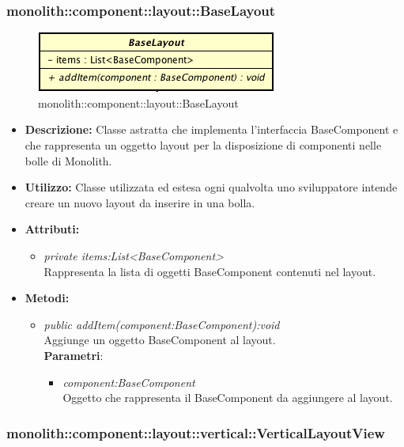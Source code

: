 \subsubsection{monolith::component::layout::BaseLayout}

\label{monolith::component::layout::BaseLayout}
\begin{figure}[ht]
	\centering
	\includegraphics[scale=0.5]{Sezioni/SottosezioniST/img/BaseLayout.png}
	\caption{monolith::component::layout::BaseLayout}
\end{figure}

\begin{itemize}
\item \textbf{Descrizione:} Classe astratta che implementa l'interfaccia BaseComponent e che rappresenta un oggetto layout per la disposizione di componenti nelle bolle di Monolith.
\item \textbf{Utilizzo:} Classe utilizzata ed estesa ogni qualvolta uno sviluppatore intende creare un nuovo layout da inserire in una bolla.
\item \textbf{Attributi:}
\begin{itemize}
\item \textit{private items:List<BaseComponent>}\\
Rappresenta la lista di oggetti BaseComponent contenuti nel layout.
\end{itemize}
\item \textbf{Metodi:}
\begin{itemize}
\item \textit{public addItem(component:BaseComponent):void}\\
Aggiunge un oggetto BaseComponent al layout.
\\ \textbf{Parametri}: \begin{itemize}
\item \textit{component:BaseComponent}\\
Oggetto che rappresenta il BaseComponent da aggiungere al layout.
\end{itemize}
\end{itemize}
\end{itemize}

\subsubsection{monolith::component::layout::vertical::VerticalLayoutView}


